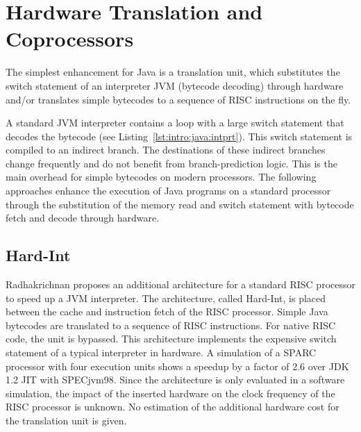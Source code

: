 



\section{Hardware Translation and Coprocessors}

The simplest enhancement for Java is a translation unit, which
substitutes the switch statement of an interpreter JVM (bytecode
decoding) through hardware and/or translates simple bytecodes
to a sequence of RISC instructions on the fly.

A standard JVM interpreter contains a loop with a large switch
statement that decodes the bytecode (see
Listing~\ref{lst:intro:java:intprt}). This switch statement is
compiled to an indirect branch. The destinations of these indirect
branches change frequently and do not benefit from branch-prediction
logic. This is the main overhead for simple bytecodes on modern
processors. The following approaches enhance the execution of Java
programs on a standard processor through the substitution of the
memory read and switch statement with bytecode fetch and decode
through hardware.


\subsection{Hard-Int}

Radhakrichnan \cite{HardInt} proposes an additional architecture for
a standard RISC processor to speed up a JVM interpreter. The
architecture, called Hard-Int, is placed between the cache and
instruction fetch of the RISC processor. Simple Java bytecodes are
translated to a sequence of RISC instructions. For native RISC code,
the unit is bypassed. This architecture implements the expensive
switch statement of a typical interpreter in hardware. A simulation
of a SPARC processor with four execution units shows a speedup by a
factor of 2.6 over JDK 1.2 JIT with SPECjvm98. Since the architecture
is only evaluated in a software simulation, the impact of the
inserted hardware on the clock frequency of the RISC processor is
unknown. No estimation of the additional hardware cost for the
translation unit is given.


